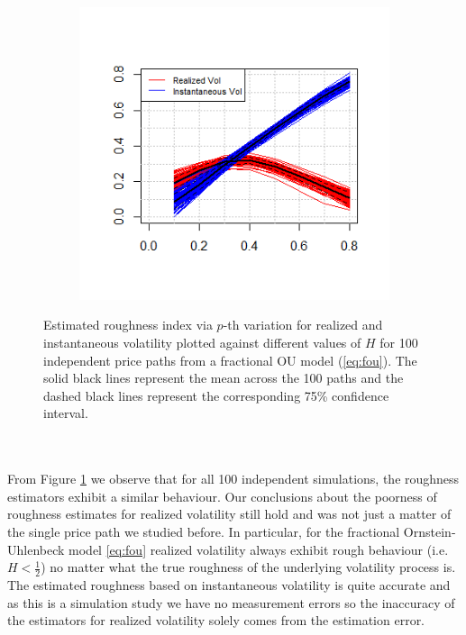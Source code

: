 \documentclass{article}
\begin{document}
\begin{figure}[htbp]
    \centering
    
    \begin{subfigure}{0.78\textwidth}
        \includegraphics[width=\linewidth]{ex7_plot100.png}
    \end{subfigure}
    
    \caption{Estimated roughness index via $p$-th variation for realized and instantaneous volatility plotted against different values of $H$ for 100 independent price paths from a fractional OU model (\ref{eq:fou}). The solid black lines represent the mean across the 100 paths and the dashed black lines represent the corresponding 75\% confidence interval.}
    \label{fig:ex7plot100}
\end{figure}\\\\
From Figure \ref{fig:ex7plot100} we observe that for all 100 independent simulations, the roughness estimators exhibit a similar behaviour. Our conclusions about the poorness of roughness estimates for realized volatility still hold and was not just a matter of the single price path we studied before. In particular, for the fractional Ornstein-Uhlenbeck model \eqref{eq:fou} realized volatility always exhibit rough behaviour (i.e. $H<\frac{1}{2}$) no matter what the true roughness of the underlying volatility process is. The estimated roughness based on instantaneous volatility is quite accurate and as this is a simulation study we have no measurement errors so the inaccuracy of the estimators for realized volatility solely comes from the estimation error. \\\\
\end{document}
